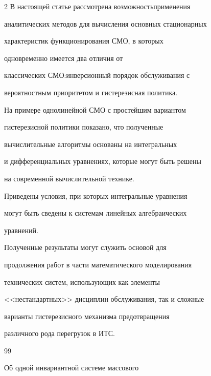 \begin{multicols}{2}
В настоящей статье рассмотрена возможность\linebreak применения


аналитических методов для вы\-чис\-ле\-ния основных стационарных


характеристик функ\-ци\-о\-ни\-ро\-ва\-ния СМО, в которых


одновременно имеется два отличия от


классических СМО:\linebreak инверсионный порядок обслуживания с


вероятностным приоритетом и гистерезисная политика.


На примере однолинейной СМО с простейшим вариантом


гистерезисной политики показано, что полученные


вычислительные алгоритмы основаны на интегральных


и дифференциальных уравнениях, которые могут быть решены


на современной вы\-чис\-ли\-тель\-ной технике.


Приведены условия, при которых интегральные уравнения


могут быть сведены к системам линейных алгебраических


уравнений.





Полученные результаты могут служить основой для


продолжения работ в части математического моделирования


технических систем, ис\-поль\-зу\-ющих как элементы


<<нестандартных>> дисциплин обслуживания, так и сложные


варианты гистерезисного механизма предотвращения


различного рода перегрузок в ИТС.








{\small\frenchspacing


{%




\begin{thebibliography}{99}







 Об одной инвариантной системе массового



\end{thebibliography}}}
\end{multicols}
